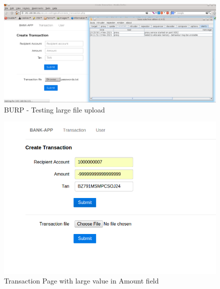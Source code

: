\begin{figure}[ht]
	\centering
		\includegraphics[width=.8\linewidth]{figures/OTG-INPVAL-014_1.png}
		\caption{BURP - Testing large file upload}
	\label{fig:burp_large_file_upload}
\end{figure}
\begin{figure}[ht]
	\centering
		\includegraphics[width=.8\linewidth]{figures/OTG-INPVAL-014_2.png}
		\caption{Transaction Page with large value in Amount field}
	\label{fig:overflow_transaction}
\end{figure}
